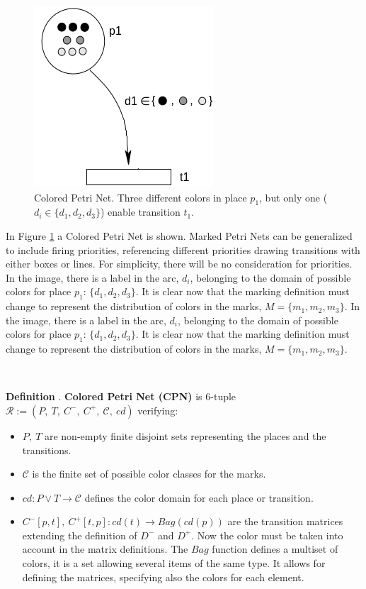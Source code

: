 \documentclass[12pt,english]{article} %
\newcounter{definitioncounter}
\newcommand*{\definition}[2]{\textbf{Definition \thedefinitioncounter\refstepcounter{definitioncounter}}.
\textbf{#1}#2}
\begin{document}
\begin{figure}[H]
    \centering
    \includegraphics[width=0.275\linewidth]{img/petri-net/cpn/cpn-example.png}
    \caption{Colored Petri Net. Three different colors in place $p_1$, but only one ($d_i \in \{d_1, d_2, d_3\}$) enable transition $t_1$.}
    \label{fig:cpn-example}
\end{figure}

In Figure \ref{fig:cpn-example} a Colored Petri Net is shown. Marked Petri Nets can be generalized to include firing priorities, referencing different priorities drawing transitions with either boxes or lines.
For simplicity, there will be no consideration for priorities.
In the image, there is a label in the arc, $d_i$, belonging to the domain of possible colors for place $p_1$: $\{d_1, d_2, d_3\}$.
It is clear now that the marking definition must change to represent the distribution of colors in the marks, $M = \{m_1, m_2, m_3\}$.
In the image, there is a label in the arc, $d_i$, belonging to the domain of possible colors for place $p_1$: $\{d_1, d_2, d_3\}$.
It is clear now that the marking definition must change to represent the distribution of colors in the marks, $M = \{m_1, m_2, m_3\}$.

\

\definition{Colored Petri Net (CPN)}{ is 6-tuple $\mathcal{R} := (P,\ T,\ C^-,\ C^+,\ \mathcal{C},\ cd)$ verifying:
\begin{itemize}
    \item $P,\ T$ are non-empty finite disjoint sets representing the places and the transitions.
    \item $\mathcal{C}$ is the finite set of possible color classes for the marks.
    \item $cd: P \vee T \rightarrow \mathcal{C}$ defines the color domain for each place or transition.
    \item $C^- [p,t], \ C^+ [t, p]: cd(t) \rightarrow Bag(cd(p))$ are the transition matrices extending the definition of $D^-$ and $D^+$. Now the color must be taken into account in the matrix definitions.
    The $Bag$ function defines a multiset of colors, it is a set allowing several items of the same type.
    It allows for defining the matrices, specifying also the colors for each element.
\end{itemize}}
\end{document}
